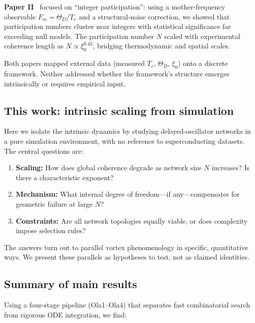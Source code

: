 \documentclass[reprint,aps,prb,superscriptaddress,floatfix]{revtex4-2}
\begin{document}
\textbf{Paper II}~\cite{Agostino2025b} focused on ``integer participation'': using a mother-frequency observable $F_m = \Theta_D/T_c$ and a structural-noise correction, we showed that participation numbers cluster near integers with statistical significance far exceeding null models. The participation number $N$ scaled with experimental coherence length as $N \propto \xi_0^{0.43}$, bridging thermodynamic and spatial scales.

Both papers mapped external data (measured $T_c$, $\Theta_D$, $\xi_0$) onto a discrete framework. Neither addressed whether the framework's structure emerges intrinsically or requires empirical input.

\subsection{This work: intrinsic scaling from simulation}

Here we isolate the intrinsic dynamics by studying delayed-oscillator networks in a pure simulation environment, with no reference to superconducting datasets. The central questions are:

\begin{enumerate}
\item \textbf{Scaling:} How does global coherence degrade as network size $N$ increases? Is there a characteristic exponent?
\item \textbf{Mechanism:} What internal degree of freedom---if any---compensates for geometric failure at large $N$?
\item \textbf{Constraints:} Are all network topologies equally viable, or does complexity impose selection rules?
\end{enumerate}

The answers turn out to parallel vortex phenomenology in specific, quantitative ways. We present these parallels as hypotheses to test, not as claimed identities.

\subsection{Summary of main results}

Using a four-stage pipeline (Ola1--Ola4) that separates fast combinatorial search from rigorous ODE integration, we find:
\end{document}
